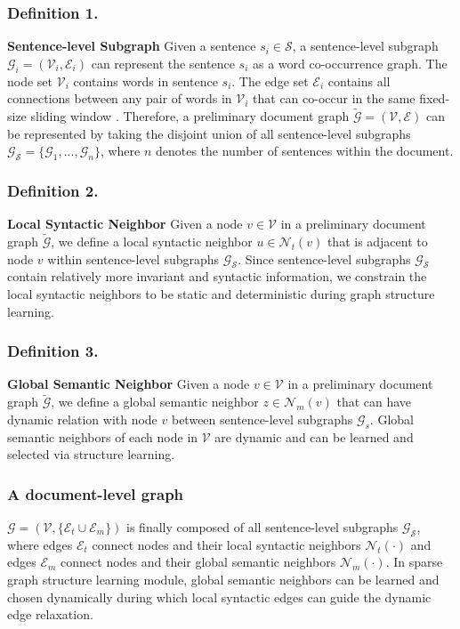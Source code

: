 \documentclass[letterpaper]{article} %
\begin{document}
\subsubsection{Definition 1.}\textbf{Sentence-level Subgraph} Given a sentence \(s_i \in \mathcal{S} \), a sentence-level subgraph \( \mathcal{G}_i = (\mathcal{V}_i, \mathcal{E}_i)\) can represent the sentence $s_i$ as a word co-occurrence graph.
The node set \(\mathcal{V}_i\) contains words in sentence $s_i$. The edge set \(\mathcal{E}_i\) contains all connections between any pair of words in \(\mathcal{V}_i\) that can co-occur in the same fixed-size sliding window \cite{mihalcea2004textrank}. Therefore, a preliminary document graph \(\tilde{\mathcal{G}}=(\mathcal{V}, \mathcal{E})\) can be represented by taking the disjoint union of all sentence-level subgraphs \( \mathcal{G}_\mathcal{S}=\{ {\mathcal{G}_1,..., \mathcal{G}_n } \}\), where $n$ denotes the number of sentences within the document.

\subsubsection{Definition 2.}\textbf{Local Syntactic Neighbor} Given a node \(v \in \mathcal{V}\) in a preliminary document graph \(\tilde{\mathcal{G}}\), we define a local syntactic neighbor \(u \in \mathcal{N}_t(v)\) that is adjacent to node \(v\) within sentence-level subgraphs \(\mathcal{G}_\mathcal{S}\). Since sentence-level subgraphs \(\mathcal{G}_\mathcal{S}\) contain relatively more invariant and syntactic information, we constrain the local syntactic neighbors to be static and deterministic during graph structure learning.
\subsubsection{Definition 3.}\textbf{Global Semantic Neighbor} Given a node \(v \in \mathcal{V}\) in a preliminary document graph \(\tilde{\mathcal{G}}\), we define a global semantic neighbor \(z \in \mathcal{N}_m(v)\) that can have dynamic relation with node \(v\) between sentence-level subgraphs \(\mathcal{G}_s\). Global semantic neighbors of each node in \(\mathcal{V}\) are dynamic and can be learned and selected via structure learning.
\subsubsection{A document-level graph} \(\mathcal{G}=(\mathcal{V},  \{\mathcal{E}_t\cup{\mathcal{E}_m\}})\) is finally composed of all sentence-level subgraphs \(\mathcal{G}_{\mathcal{S}}\), where edges \(\mathcal{E}_t\) connect nodes and their local syntactic neighbors \(\mathcal{N}_t(\cdot)\) and edges \(\mathcal{E}_m\) connect nodes and their global semantic neighbors \(\mathcal{N}_m(\cdot)\). In sparse graph structure learning module, global semantic neighbors can be learned and chosen dynamically during which local syntactic edges can guide the dynamic edge relaxation.
\end{document}
